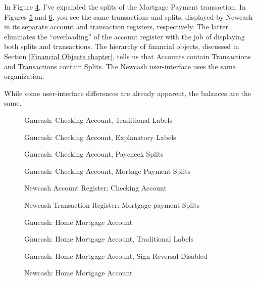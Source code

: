 \documentclass{report}
\newcommand{\graphicsfig}[5]{
\begin{figure}[#5]
\begin{center}
\resizebox{#1}{!}{\texttt{[image: \#2]}}
\end{center}
\caption{#3}
\label{#4}
\end{figure}
}
\begin{document}
In Figure \ref{Gnucash: Checking Account, Mortage Payment Splits}, I've expanded the splits of the Mortgage Payment transaction. In Figures \ref{Newcash Account Register: Checking Account}  and \ref{Newcash Transaction Register: Mortgage payment Splits}, you see the same transactions and splits, displayed by Newcash in its separate account and transaction registers, respectively. The latter eliminates the ``overloading'' of the account register with the job of displaying both splits and transactions. The hierarchy of financial objects, discussed in Section \ref{Financial Objects chapter}, tells us that Accounts contain Transactions and  Transactions contain Splits. The Newcash user-interface uses the same organization.

While some user-interface differences are already apparent, the balances are the same. 

\graphicsfig{5in}{figures/gnucash_checking_formal.png}{Gnucash: Checking Account, Traditional Labels}{Gnucash: Checking Account, Traditional Labels}{h!}
\graphicsfig{5in}{figures/gnucash_checking.png}{Gnucash: Checking Account, Explanatory Labels}{Gnucash: Checking Account, Explanatory Labels}{h!}
\graphicsfig{5in}{figures/gnucash_checking_salary_expanded.png}{Gnucash: Checking Account, Paycheck Splits}{Gnucash: Checking Account, Paycheck Splits}{h!}
\graphicsfig{5in}{figures/gnucash_checking_mortgage_expanded.png}{Gnucash: Checking Account, Mortage Payment Splits}{Gnucash: Checking Account, Mortage Payment Splits}{h!}
\graphicsfig{5in}{figures/newcash_checking.png}{Newcash Account Register: Checking Account}{Newcash Account Register: Checking Account}{h!}
\graphicsfig{5in}{figures/newcash_mortgage_splits.png}{Newcash Transaction Register: Mortgage payment Splits}{Newcash Transaction Register: Mortgage payment Splits}{h!}
\graphicsfig{5in}{figures/gnucash_home_mortgage.png}{Gnucash: Home Mortgage Account}{Gnucash: Home Mortgage Account}{h!}
\graphicsfig{5in}{figures/gnucash_home_mortgage_formal.png}{Gnucash: Home Mortgage Account, Traditional Labels}{Gnucash: Home Mortgage Account, Traditional Labels}{h!}
\graphicsfig{5in}{figures/gnucash_home_mortgage_no_reversal.png}{Gnucash: Home Mortgage Account, Sign Reversal Disabled}{Gnucash: Home Mortgage Account, Sign Reversal Disabled}{h!}
\graphicsfig{5in}{figures/newcash_home_mortgage.png}{Newcash: Home Mortgage Account}{Newcash: Home Mortgage Account}{h!}
\end{document}

